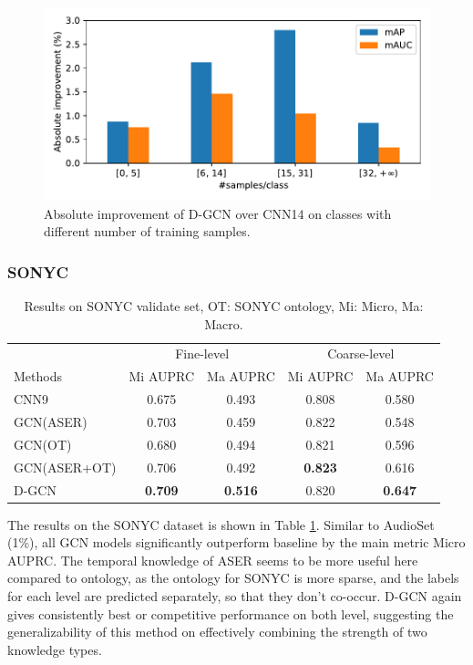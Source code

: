 \begin{figure}[htbp]
\setlength{\abovecaptionskip}{0.cm}
\setlength{\belowcaptionskip}{-0.5cm}
\centering
\includegraphics[width=0.9\linewidth]{figures/1p_delta_map_auc.pdf}
\caption{Absolute improvement of D-GCN over CNN14 on classes with different number 
of training samples.}
\label{fig:delta_map_auc}
\end{figure}

\subsubsection{SONYC}

\begin{table}[tbp]
  \setlength{\belowcaptionskip}{-0.cm}
    \centering
    \small
    \begin{tabular}{lcccc}
        \hline
        {} & \multicolumn{2}{c}{Fine-level} & \multicolumn{2}{c}{Coarse-level} \\
        \cline{2-3}\cline{4-5} 
        Methods & Mi AUPRC & Ma AUPRC & Mi AUPRC & Ma AUPRC \\
        \hline
        CNN9 & 0.675 & 0.493 & 0.808 & 0.580 \\
        GCN(ASER) & 0.703 & 0.459 & 0.822 & 0.548 \\
        GCN(OT) & 0.680 & 0.494 & 0.821 & 0.596 \\
        GCN(ASER+OT) & 0.706 & 0.492 & \textbf{0.823} & 0.616 \\
        D-GCN & \textbf{0.709} & \textbf{0.516} & 0.820 & \textbf{0.647} \\
        \hline
    \end{tabular}
    \caption{\label{tab:SONYC} Results on SONYC validate set, OT: SONYC ontology, Mi: Micro, Ma: Macro.}
    \vspace{-4mm}
  \end{table}

The results on the SONYC dataset is shown in Table \ref{tab:SONYC}. Similar to AudioSet (1\%), all GCN models significantly outperform baseline by the main metric Micro AUPRC. The temporal knowledge of ASER seems to be more useful here compared to ontology, as the ontology for SONYC is more sparse, and the labels for each level are predicted separately, so that they don't co-occur. D-GCN again gives consistently best or competitive performance on both level, suggesting the generalizability of this method on effectively combining the strength of two knowledge types.
